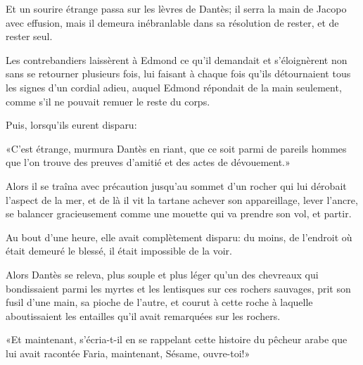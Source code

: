 Et un sourire étrange passa sur les lèvres de Dantès; il serra la main de Jacopo avec effusion, mais il demeura inébranlable dans sa résolution de rester, et de rester seul.

Les contrebandiers laissèrent à Edmond ce qu'il demandait et s'éloignèrent non sans se retourner plusieurs fois, lui faisant à chaque fois qu'ils détournaient tous les signes d'un cordial adieu, auquel Edmond répondait de la main seulement, comme s'il ne pouvait remuer le reste du corps.

Puis, lorsqu'ils eurent disparu:

«C'est étrange, murmura Dantès en riant, que ce soit parmi de pareils hommes que l'on trouve des preuves d'amitié et des actes de dévouement.»

Alors il se traîna avec précaution jusqu'au sommet d'un rocher qui lui dérobait l'aspect de la mer, et de là il vit la tartane achever son appareillage, lever l'ancre, se balancer gracieusement comme une mouette qui va prendre son vol, et partir.

Au bout d'une heure, elle avait complètement disparu: du moins, de l'endroit où était demeuré le blessé, il était impossible de la voir.

Alors Dantès se releva, plus souple et plus léger qu'un des chevreaux qui bondissaient parmi les myrtes et les lentisques sur ces rochers sauvages, prit son fusil d'une main, sa pioche de l'autre, et courut à cette roche à laquelle aboutissaient les entailles qu'il avait remarquées sur les rochers.

«Et maintenant, s'écria-t-il en se rappelant cette histoire du pêcheur arabe que lui avait racontée Faria, maintenant, Sésame, ouvre-toi!»



